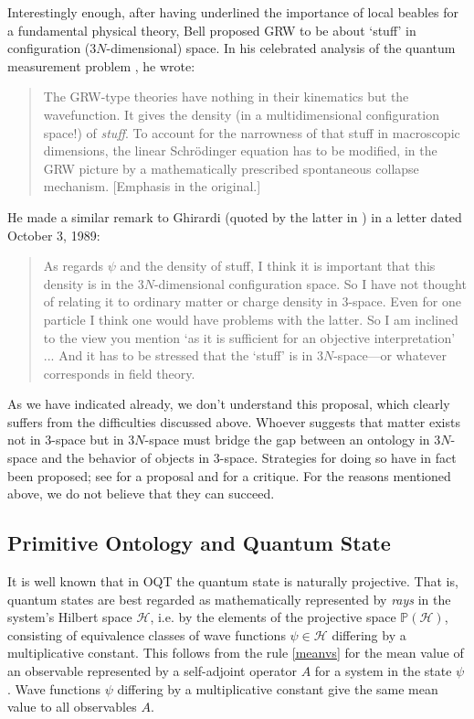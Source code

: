 \documentclass[12pt]{article}
\begin{document}
Interestingly enough, after having underlined the importance of local beables for a fundamental physical theory, Bell proposed {\sf GRW} to be about `stuff' in configuration ($3N$-dimensional)
space. In his celebrated analysis of the quantum measurement problem \citep{Bell90}, he wrote:
\begin{quote}
  The GRW-type theories have nothing in their kinematics but the
  wavefunction. It gives the density (in a multidimensional
  configuration space!) of \emph{stuff}. To account for the narrowness
  of that stuff in macroscopic dimensions, the linear Schr\"odinger
  equation has to be modified, in the GRW picture by a mathematically
  prescribed spontaneous collapse mechanism. [Emphasis in the
  original.]
\end{quote}
He made a similar remark to Ghirardi (quoted by the latter in \citep[p.~345]{BG03}) in a letter dated October 3, 1989: 
\begin{quote}
  As regards $\psi$ and the density of stuff, I think it is important that this density is in the $3N$-dimensional configuration space. So I have not thought of relating it to ordinary matter or charge density in $3$-space.  Even for one particle I think one would have problems with the latter. So I am inclined to the view you mention `as it is sufficient for an objective interpretation' ... And it has to be stressed that the `stuff' is in $3N$-space---or whatever corresponds in field theory. 
\end{quote} 

As we have indicated already, we don't understand this proposal, which
clearly suffers from the difficulties discussed above.  Whoever suggests
that matter exists not in $3$-space but in $3N$-space must bridge the gap
between an ontology in $3N$-space and the behavior of objects in $3$-space.
Strategies for doing so have in fact been proposed; see \citep{albert1} for
a proposal and
\citep{monton} for a critique. For the reasons mentioned above, we do not
believe that they can succeed.


\subsection{Primitive Ontology and Quantum State}
It is well known that in {\sf OQT} the quantum state is naturally projective. {That is,} quantum states are best regarded as mathematically represented by {\em rays} in the system's Hilbert space $\mathscr{H}$, i.e. by the elements  of the projective space $\mathbb{P}(\mathscr{H})$, consisting of equivalence classes of wave functions $\psi\in \mathscr{H}$ differing by a multiplicative constant. 
{This follows from} the rule \eqref{meanvs}
for the mean value of an observable represented by a self-adjoint operator $A$ for a system 
in the state $\psi$. 
Wave functions $\psi$  differing by a multiplicative constant give the same mean value to all observables $A$.
\end{document}
